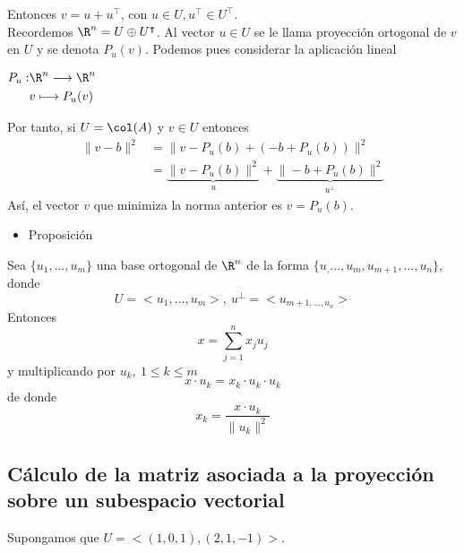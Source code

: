 Entonces $v=u+u^\intercal$, con $u\in U, u^\intercal\in U^\intercal$.\\
Recordemos $\R^n=U\oplus U^\intercal$. Al vector $u\in U$ se le llama proyección ortogonal de $v$ en $U$ y se denota $P_u(v)$. Podemos pues considerar la aplicación lineal \begin{center}
	$\begin{aligned}
		P_u:&\R^n\longrightarrow\R^n\\
		&v\longmapsto P_u(v)
	\end{aligned}$\\
\end{center}
Por tanto, si $U=\col(A)$ y $v\in U$ entonces \begin{align*}
	\|v-b\|^2&=\|v-P_u(b)+(-b+P_u(b))\|^2\\
	&=\underbrace{\|v-P_u(b)\|^2}_u+\underbrace{\|-b+P_u(b)\|^2}_{u^\perp}
\end{align*}
Así, el vector $v$ que minimiza la norma anterior es $v=P_u(b)$.

\begin{itemize}[label=\color{red}\textbullet, leftmargin=*]
	\item \color{lightblue}Proposición
\end{itemize}
Sea $\{u_1,\dots,u_m\}$ una base ortogonal de $\R^n$ de la forma $\{u_,\dots,u_m,u_{m+1},\dots,u_n\}$, donde \[ U=<u_1,\dots,u_m>,\:u^\perp=<u_{m+1,\dots,u_n}> \]Entonces \[ x=\sum_{j=1}^{n}x_ju_j \] y multiplicando por $u_k,\:1\le k\le m$ \[ x\cdot u_k=x_k\cdot u_k\cdot u_k \] de donde \[ x_k=\dfrac{x\cdot u_k}{\|u_k\|^2} \]
\subsection{Cálculo de la matriz asociada a la proyección sobre un subespacio vectorial}
Supongamos que $U=<(1,0,1),(2,1,-1)>$.


